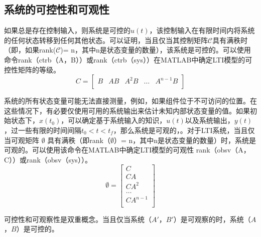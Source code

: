 \documentclass[UTF8]{ctexart}
\begin{document}
\subsection{ 系统的可控性和可观性}
\par 如果总是存在控制输入，则系统是可控的$ u(t)$，该控制输入在有限时间内将系统的任何状态转移到任何其他状态。可以证明，当且仅当其控制矩阵$ \mathcal {C} $具有满秩时（即，如果rank($ \mathcal {C} $)= n，其中n是状态变量的数量），该系统是可控的。可以使用命令rank（ctrb（A，B））或rank（ctrb（sys））在MATLAB中确定LTI模型的可控性矩阵的等级。
\begin{equation}
    C=\begin{bmatrix}
    B & AB & A^{2}B & \ldots & A^{n-1}B\\
    \end{bmatrix}
\end{equation}
\par  系统的所有状态变量可能无法直接测量，例如，如果组件位于不可访问的位置。在这些情况下，有必要仅使用可用的系统输出来估计未知内部状态变量的值。如果初始状态下，$ x(t_0)$，可以确定基于系统输入的知识，$ u(t)$以及系统输出，$ y(t)$，过一些有限的时间间隔$ t_0 <t <t_f $，那么系统是可观的，。对于LTI系统，当且仅当可观矩阵 $\mathcal \emptyset$  具有满秩（即rank（$\mathcal \emptyset$）= n，其中n是状态变量的数量）时，系统是可观的。可以使用该命令在MATLAB中确定LTI模型的可观性 rank（obsv（A，C））或rank（obsv（sys））。
\begin{equation}
    \emptyset =\begin{bmatrix}
    C\\CA\\ CA^{2}\\ \ldots \\ CA^{n-1}\\
    \end{bmatrix}
\end{equation}
\par 可控性和可观察性是双重概念。当且仅当系统（$ A'$，$ B'$）是可观察的时，系统（$ A $，$ B $）是可控的。
\end{document}
